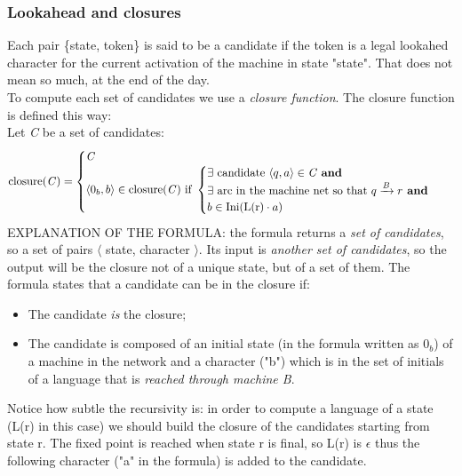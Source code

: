 \documentclass[10pt,a4paper]{article}
\begin{document}
				\subsubsection{Lookahead and closures}
					Each pair \{state, token\} is said to be a candidate if the token is a legal lookahed character for the current activation of the machine in state "state". That does not mean so much, at the end of the day.\\
					To compute each set of candidates we use a \emph{closure function}. The closure function is defined this way:\\
					Let \emph{C} be a set of candidates:
					\begin{equation}
						\text{closure(\emph{C})} =
						\begin{cases}
					  		\text{\emph{C}} \\
					  		\langle 0_b, b \rangle \in \text{closure(\emph{C}) if }
					  		\begin{cases}
					  			\exists \text{ candidate } \langle q, a\rangle \in \text{\emph{C} \textbf{and}}\\
					  			\exists \text{ arc in the machine net so that } q \xrightarrow{B} r \text{\textbf{ and}}\\
					  			b \in \text{Ini(L(r)} \cdot a \text{)}
					  		\end{cases} 
						\end{cases}
				  	\end{equation}
				  	EXPLANATION OF THE FORMULA: the formula returns a \emph{set of candidates}, so a set of pairs $\langle$ state, character $\rangle$. Its input is \emph{another set of candidates}, so the output will be the closure not of a unique state, but of a set of them. The formula states that a candidate can be in the closure if:
				  	\begin{itemize}
				  		\item The candidate \emph{is} the closure;
				  		\item The candidate is composed of an initial state (in the formula written as $0_b$) of a machine in the network and a character ("b") which is in the set of initials of a language that is \emph{reached through machine B}.
				  	\end{itemize}
				  	Notice how subtle the recursivity is: in order to compute a language of a state (L(r) in this case) we should build the closure of the candidates starting from state r. The fixed point is reached when state r is final, so L(r) is $\epsilon$ thus the following character ("a" in the formula) is added to the candidate.
				
\end{document}

